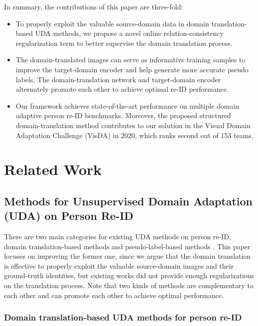 \documentclass[journal]{IEEEtran}
\begin{document}
In summary, the contributions of this paper are three-fold:
\begin{itemize}
\item To properly exploit the valuable source-domain data in domain translation-based UDA methods,
we propose a novel online relation-consistency regularization term to better supervise the domain translation process.
\item The domain-translated images can serve as informative training samples to improve the target-domain encoder and help generate more accurate pseudo labels.
The domain-translation network and target-domain encoder alternately promote each other to achieve optimal re-ID performance.
\item Our framework achieves state-of-the-art performance on multiple domain adaptive person re-ID benchmarks.
Moreover, the proposed structured domain-translation method contributes to our solution \cite{ge2020improved} in the Visual Domain Adaptation Challenge (VisDA) in 2020, which ranks second out of 153 teams.
\end{itemize}

\section{Related Work}

\subsection{Methods for Unsupervised Domain Adaptation (UDA) on Person Re-ID}

There are two main categories for existing UDA methods on person re-ID, domain translation-based methods \cite{deng2018image,wei2018person,deng2018similarity,chen2019instance,8931652,tang2020cgan,huang2019sbsgan} and pseudo-label-based methods \cite{fan2018unsupervised,zhang2019self,yang2019selfsimilarity,ge2020mutual,8713423}.
This paper focuses on improving the former one, since we argue that the domain translation is effective to properly exploit the valuable source-domain images and their ground-truth identities, but existing works did not provide enough regularizations on the translation process.
Note that two kinds of methods are complementary to each other and can promote each other to achieve optimal performance.



\subsubsection{\textbf{Domain translation-based UDA methods for person re-ID}}
\end{document}
